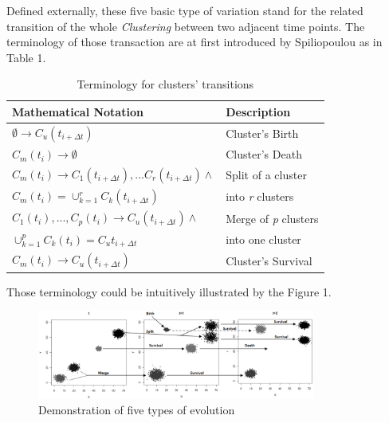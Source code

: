 \documentclass{sig-alternate}
\begin{document}
Defined externally, these five basic type of variation stand for the related transition of the whole \emph{Clustering} between two adjacent time points. The terminology of those transaction are at first introduced by Spiliopoulou\cite{SPILIOPOULOU:transition} as in Table 1.
\begin{table}
  \centering
  \caption{Terminology for clusters' transitions}
  \begin{tabular}{|l|l|}
    \hline
    \textbf{Mathematical Notation} & \textbf{Description} \\ \hline
    $\emptyset\rightarrow C_u(t_{i+\Delta t})$ & Cluster's Birth \\ \hline

    $C_m(t_i)\rightarrow\emptyset$ & Cluster's Death \\ \hline

    $C_m(t_i)\rightarrow{C_1(t_{i+\Delta t}),...C_r(t_{i+\Delta t})}\land$ & Split of a cluster \\
    $C_m(t_i)=\cup_{k=1}^rC_k(t_{i+\Delta t})$ & into \emph{r} clusters \\ \hline

    ${C_1(t_i),...,C_p(t_i)}\rightarrow C_u(t_{i+\Delta t})\land$ & Merge of \emph{p} clusters \\
    $\cup_{k=1}^pC_k(t_i)=C_u{t_{i+\Delta t}}$ & into one cluster \\ \hline

    $C_m(t_i)\rightarrow C_u(t_{i+\Delta t})$ & Cluster's Survival \\ \hline
  \end{tabular}
\end{table}

Those terminology could be intuitively illustrated by the Figure 1.

\begin{figure}
  \centering
  \includegraphics[height=1.15in]{evolution}
  \caption{Demonstration of five types of evolution}
\end{figure}
\end{document}
